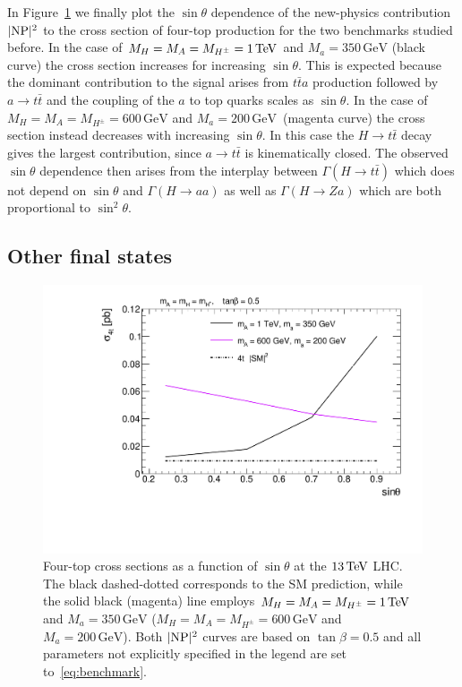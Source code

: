 \documentclass[review]{elsarticle}
\newcommand{\mA}{\ensuremath{M_{A}}\xspace}
\newcommand{\ma}{\ensuremath{M_{a}}\xspace}
\newcommand{\mH}{\ensuremath{M_{H}}\xspace}
\newcommand{\mHc}{\ensuremath{M_{H^{\pm}}}\xspace}
\begin{document}
In Figure~\ref{DMHF-4top-scan3} we finally plot the  $\sin \theta$ dependence of the new-physics contribution~$|{\rm NP}|^2$ to the cross section of four-top production for the two benchmarks studied before. 
In the case of $\mH =\mA=\mHc = 1 \, {\rm TeV}$ and $\ma = 350 \, {\mathrm{GeV}}$ (black curve) the cross section  increases for increasing $\sin \theta$. This is expected because the dominant contribution to the signal arises from $t \bar t  a$ production followed by $a \to t \bar t$ and the coupling of the $a$ to top quarks scales as $\sin \theta$. In the case of $\mH =\mA=\mHc = 600 \, {\mathrm{GeV}}$ and $\ma = 200 \, {\mathrm{GeV}}$~(magenta curve) the cross section instead decreases with increasing $\sin \theta$.  In this case  the $H \to t \bar t$ decay gives the largest  contribution, since $a \to t \bar t$ is kinematically closed. The observed $\sin \theta$ dependence then arises from the interplay between $\Gamma (H \to t \bar t)$ which does not depend on $\sin \theta$ and $\Gamma (H \to aa)$ as well as $\Gamma (H \to Za)$ which are both proportional to $\sin^2 \theta$.
 
\subsection{Other final states}
\label{sec:others}

\begin{figure}[t!]
\centering
\includegraphics[width=.625\textwidth]{plot_st.pdf}
\vspace{1mm}
\caption{\label{DMHF-4top-scan3} Four-top cross sections as a function of $\sin \theta$ at the $13 \, {\rm TeV}$ LHC. The black dashed-dotted corresponds to the SM prediction, while the solid black (magenta) line employs  $\mH =\mA=\mHc = 1 \, {\rm TeV}$ and $\ma = 350  \, {\mathrm{GeV}}$ ($\mH =\mA=\mHc = 600 \, {\mathrm{GeV}}$ and $\ma = 200 \, {\mathrm{GeV}}$). Both $|{\rm NP}|^2$ curves are based on $\tan \beta = 0.5$ and all parameters not explicitly specified in the legend are set to~\eqref{eq:benchmark}. }
\end{figure}
\end{document}
